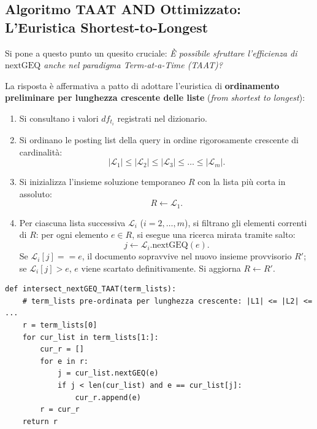 \FloatBarrier
\subsection{Algoritmo TAAT AND Ottimizzato: L'Euristica Shortest-to-Longest}
\label{subsec:taat-and-nextgeq-ottimizzato}
Si pone a questo punto un quesito cruciale: \textit{\`E possibile sfruttare l'efficienza di $\text{nextGEQ}$ anche nel paradigma Term-at-a-Time (TAAT)?}

La risposta \`e affermativa a patto di adottare l'euristica di \textbf{ordinamento preliminare per lunghezza crescente delle liste} (\textit{from shortest to longest}):
\begin{enumerate}
    \item Si consultano i valori $df_{t_i}$ registrati nel dizionario.
    \item Si ordinano le posting list della query in ordine rigorosamente crescente di cardinalit\`a:
    \begin{equation}
    |\mathcal{L}_1| \le |\mathcal{L}_2| \le |\mathcal{L}_3| \le \dots \le |\mathcal{L}_m|.
    \end{equation}
    \item Si inizializza l'insieme soluzione temporaneo $R$ con la lista pi\`u corta in assoluto:
    \begin{equation}
    R \gets \mathcal{L}_1.
    \end{equation}
    \item Per ciascuna lista successiva $\mathcal{L}_i$ ($i = 2, \dots, m$), si filtrano gli elementi correnti di $R$: per ogni elemento $e \in R$, si esegue una ricerca mirata tramite salto:
    \[
    j \gets \mathcal{L}_i.\text{nextGEQ}(e).
    \]
    Se $\mathcal{L}_i[j] == e$, il documento sopravvive nel nuovo insieme provvisorio $R'$; se $\mathcal{L}_i[j] > e$, $e$ viene scartato definitivamente. Si aggiorna $R \gets R'$.
\end{enumerate}

\begin{lstlisting}[style=pythoncode, caption={Algoritmo TAAT AND ottimizzato con ordinamento Shortest-to-Longest e salti $\text{nextGEQ}$.}, label={lst:taat-and-nextgeq}]
def intersect_nextGEQ_TAAT(term_lists):
    # term_lists pre-ordinata per lunghezza crescente: |L1| <= |L2| <= ...
    r = term_lists[0]
    for cur_list in term_lists[1:]:
        cur_r = []
        for e in r:
            j = cur_list.nextGEQ(e)
            if j < len(cur_list) and e == cur_list[j]:
                cur_r.append(e)
        r = cur_r
    return r
\end{lstlisting}

